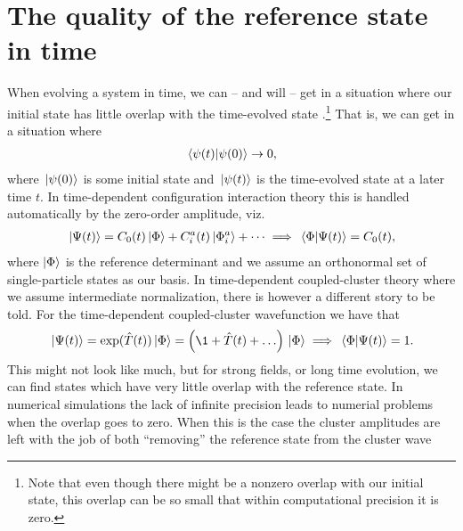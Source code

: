     \section{The quality of the reference state in time}
        \label{sec:cc-phase}
        When evolving a system in time, we can -- and will -- get in a
        situation where our initial state has little overlap with the
        time-evolved state \cite{pedersen2018symplectic}.\footnote{%
            Note that even though there might be a nonzero overlap with our
            initial state, this overlap can be so small that within
            computational precision it is zero.
        }
        That is, we can get in a situation where
        \begin{align}
            \braket*{\psi(t)}{\psi(0)} \to 0,
        \end{align}
        where $\ket*{\psi(0)}$ is some initial state and $\ket*{\psi(t)}$ is
        the time-evolved state at a later time $t$.
        In time-dependent configuration interaction theory this is handled
        automatically by the zero-order amplitude, viz.
        \begin{gather}
            \ket*{\Psi(t)}
            = C_0(t)\ket*{\Phi}
            + C^{a}_{i}(t)\ket*{\Phi^{a}_{i}}
            + \dots
            \implies
            \braket*{\Phi}{\Psi(t)} = C_0(t),
        \end{gather}
        where $\ket{\Phi}$ is the reference determinant and we assume an
        orthonormal set of single-particle states as our basis.
        In time-dependent coupled-cluster theory where we assume
        intermediate normalization, there is however a different story to be
        told.
        For the time-dependent coupled-cluster wavefunction we have that
        \begin{gather}
            \ket*{\Psi(t)}
            = \exponential(\clust(t))\ket*{\slat}
            = \para{
                \1
                + \clust(t)
                + \dots
            }\ket*{\slat}
            \implies
            \braket*{\slat}{\Psi(t)} = 1.
        \end{gather}
        This might not look like much, but for strong fields, or long
        time evolution, we can find states which have very little overlap
        with the reference state.
        In numerical simulations the lack of infinite precision leads to
        numerial problems when the overlap goes to zero.
        When this is the case the cluster amplitudes are left with the job
        of both ``removing'' the reference state from the cluster wave
